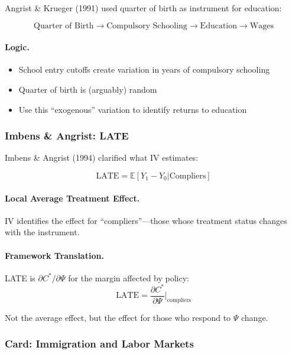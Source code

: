 Angrist \& Krueger (1991) used quarter of birth as instrument for education:

\begin{equation}
\boxed{
\text{Quarter of Birth} \to \text{Compulsory Schooling} \to \text{Education} \to \text{Wages}
}
\label{eq:angrist-krueger}
\end{equation}

\paragraph{Logic.}
\begin{itemize}
    \item School entry cutoffs create variation in years of compulsory schooling
    \item Quarter of birth is (arguably) random
    \item Use this ``exogenous'' variation to identify returns to education
\end{itemize}

\subsubsection{Imbens \& Angrist: LATE}

Imbens \& Angrist (1994) clarified what IV estimates:

\begin{equation}
\boxed{
\text{LATE} = \mathbb{E}[Y_1 - Y_0 | \text{Compliers}]
}
\label{eq:late}
\end{equation}

\paragraph{Local Average Treatment Effect.}
IV identifies the effect for ``compliers''---those whose treatment status 
changes with the instrument.

\paragraph{Framework Translation.}
LATE is $\partial C^* / \partial \Psi$ for the margin affected by policy:
\begin{equation}
\text{LATE} = \frac{\partial C^*}{\partial \Psi} \bigg|_{\text{compliers}}
\end{equation}

Not the average effect, but the effect for those who respond to $\Psi$ change.

\subsubsection{Card: Immigration and Labor Markets}

